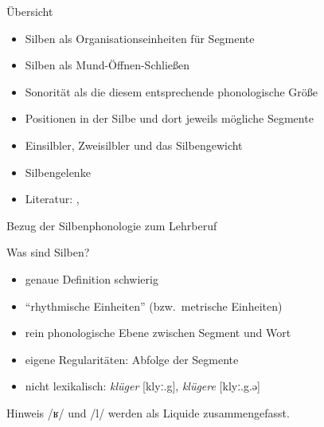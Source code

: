 \begin{frame}
  {Übersicht}
  \pause
  \begin{itemize}[<+->]
    \item Silben als Organisationseinheiten für Segmente
    \item Silben als Mund-Öffnen-Schließen
    \item \alert{Sonorität} als die diesem entsprechende phonologische Größe
    \item Positionen in der Silbe und dort jeweils mögliche Segmente
    \item Einsilbler, Zweisilbler und das \alert{Silbengewicht}
    \item \alert{Silbengelenke}
      \Zeile
    \item Literatur: , \citet{Maas2002}
  \end{itemize}
\end{frame}


\begin{frame}
  {Bezug der Silbenphonologie zum Lehrberuf}
  \pause
  \centering
  \LARGE
  \\
  \pause
  \Zeile
\end{frame}


\begin{frame}
  {Was sind Silben?}
  \pause
  \begin{itemize}[<+->]
    \item genaue Definition schwierig
    \item "`rhythmische Einheiten"' (bzw.\ metrische Einheiten)
      \Zeile
    \item \alert{rein phonologische} Ebene \alert{zwischen Segment und Wort}
    \item eigene \alert{Regularitäten}: Abfolge der Segmente
      \Zeile
    \item \alert{nicht lexikalisch}: \textit{klüger} [klyː.g], \textit{klügere} [klyː.g.ə]
  \end{itemize}
\end{frame}

\begin{frame}
  {Hinweis}
  \pause
  \Zeile\Zeile
  \centering
  \Large /ʁ/ und /l/ werden als \alert{Liquide} zusammengefasst.
\end{frame}


